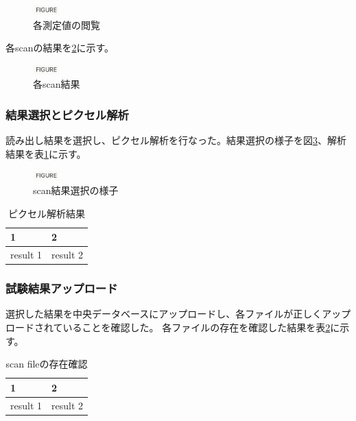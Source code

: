 \begin{figure}[bpt]\centering
\includegraphics[width=1cm]{figure}
\caption[各測定値の閲覧]{各測定値の閲覧}
\label{view_dcs}
\end{figure}

各scanの結果を\ref{scan_result}に示す。

\begin{figure}[bpt]\centering
\includegraphics[width=1cm]{figure}
\caption[各scan結果]{各scan結果}
\label{scan_result}
\end{figure}

\subsubsection{結果選択とピクセル解析}
読み出し結果を選択し、ピクセル解析を行なった。結果選択の様子を図\ref{select_scans}、解析結果を表\ref{pixel_analysis_result}に示す。

\begin{figure}[bpt]\centering
\includegraphics[width=1cm]{figure}
\caption[scan結果選択の様子]{scan結果選択の様子}
\label{select_scans}
\end{figure}

\begin{table}[tbp]
\begin{center}
\caption[ピクセル解析結果]{ピクセル解析結果}
\label{pixel_analysis_result}
  \begin{tabular}{|ll|} \hline
    1 & 2 \\ \hline
    result 1 & result 2 \\ \hline 
  \end{tabular}
\end{center}
\end{table}

\subsubsection{試験結果アップロード}
選択した結果を中央データベースにアップロードし、各ファイルが正しくアップロードされていることを確認した。
各ファイルの存在を確認した結果を表\ref{scan_upload_pd}に示す。

\begin{table}[tbp]
\begin{center}
\caption[scan fileの存在確認]{scan fileの存在確認}
\label{scan_upload_pd}
  \begin{tabular}{|ll|} \hline
    1 & 2 \\ \hline
    result 1 & result 2 \\ \hline 
  \end{tabular}
\end{center}
\end{table}

